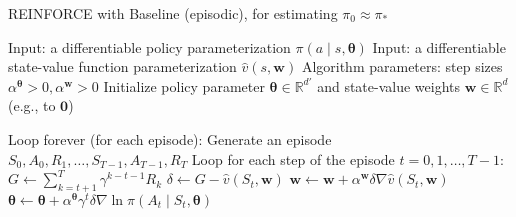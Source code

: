 REINFORCE with Baseline (episodic), for estimating \( \pi_0 \approx \pi_*\)

Input: a differentiable policy parameterization \( \pi(a \mid s, \mathbf\theta) \)
Input: a differentiable state-value function parameterization \( \hat{v}(s, \mathbf{w}) \)
Algorithm parameters: step sizes \( \alpha^\mathbf\theta > 0 , \alpha^\mathbf{w} > 0 \)
Initialize policy parameter \( \mathbf\theta \in \mathbb{R}^{d'} \) and state-value weights \( \mathbf{w} \in \mathbb{R}^d \) (e.g., to \( \mathbf{0} \))

Loop forever (for each episode):
	Generate an episode \( S_0, A_0, R_1, \ldots, S_{T-1}, A_{T-1}, R_T \)
	Loop for each step of the episode \( t = 0, 1, \ldots, T - 1 \):
		\( G \leftarrow \sum_{k = t + 1}^{T}{\gamma^{k - t - 1} R_k} \)
		\( \delta \leftarrow G - \hat{v}(S_t, \mathbf{w}) \)
		\( \mathbf{w} \leftarrow \mathbf{w} + \alpha^\mathbf{w}\delta\nabla{\hat{v}(S_t, \mathbf{w})} \)
		\( \mathbf\theta \leftarrow \mathbf\theta + \alpha^\mathbf\theta \gamma^t \delta \nabla{\ln{\pi(A_t \mid S_t, \mathbf\theta)}} \)
